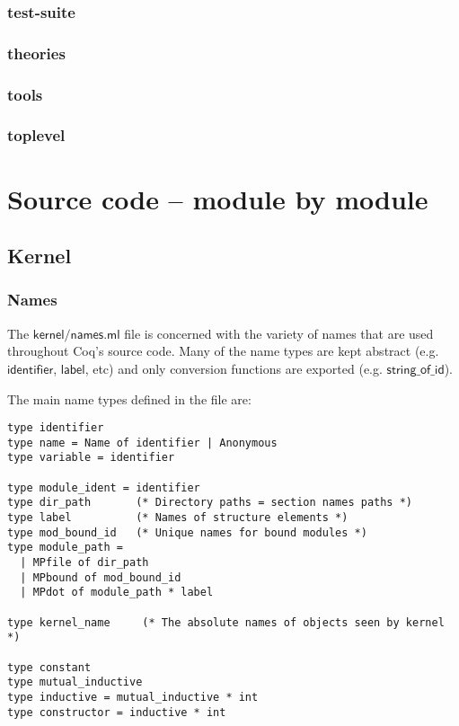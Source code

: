 \documentclass[a4paper,oneside]{book}
\newcommand{\m}[1]{\ensuremath{\mathsf{#1}}}
\begin{document}
\subsection{test-suite}
\subsection{theories}
\subsection{tools}
\subsection{toplevel}

\chapter{Source code -- module by module}

\section{Kernel}

\subsection{Names}

The \m{kernel/names.ml} file is concerned with the variety of names
that are used throughout Coq's source code. Many of the name types are
kept abstract (e.g. \m{identifier}, \m{label}, etc) and only
conversion functions are exported (e.g. \m{string\_of\_id}).

The main name types defined in the file are:

\begin{lstlisting}
type identifier
type name = Name of identifier | Anonymous
type variable = identifier

type module_ident = identifier
type dir_path       (* Directory paths = section names paths *)
type label          (* Names of structure elements *)
type mod_bound_id   (* Unique names for bound modules *)
type module_path =
  | MPfile of dir_path
  | MPbound of mod_bound_id
  | MPdot of module_path * label

type kernel_name     (* The absolute names of objects seen by kernel *)

type constant
type mutual_inductive
type inductive = mutual_inductive * int
type constructor = inductive * int
\end{lstlisting}
\end{document}
